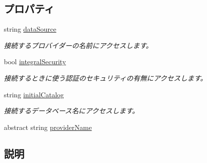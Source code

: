 \subsection*{プロパティ}
\begin{DoxyCompactItemize}
\item 
string \hyperlink{classlazurite_1_1relation_1_1common_1_1_a_d_o_data_source_a69dab29118f44b9d13e20f478c6858a3}{dataSource}
\begin{DoxyCompactList}\small\item\em 接続するプロバイダーの名前にアクセスします。 \item\end{DoxyCompactList}\item 
bool \hyperlink{classlazurite_1_1relation_1_1common_1_1_a_d_o_data_source_a119ec013a937e5e9caa70c3647e78dae}{integralSecurity}
\begin{DoxyCompactList}\small\item\em 接続するときに使う認証のセキュリティの有無にアクセスします。 \item\end{DoxyCompactList}\item 
string \hyperlink{classlazurite_1_1relation_1_1common_1_1_a_d_o_data_source_a1f193a5ed7eb84c41dc0d746ec8abade}{initialCatalog}
\begin{DoxyCompactList}\small\item\em 接続するデータベース名にアクセスします。 \item\end{DoxyCompactList}\item 
abstract string \hyperlink{classlazurite_1_1relation_1_1common_1_1_a_d_o_data_source_ad238c170cf658cfdc3a1cf1843aeb956}{providerName}
\end{DoxyCompactItemize}


\subsection{説明}


